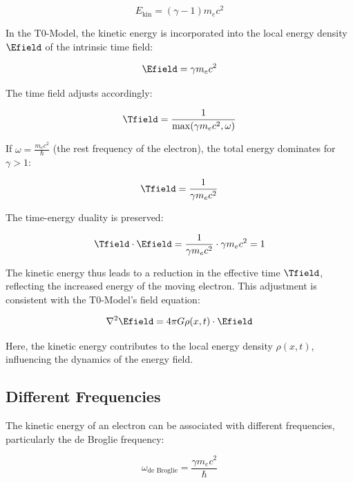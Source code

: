 \begin{equation}
	E_{\text{kin}} = (\gamma - 1) m_e c^2
\end{equation}

In the T0-Model, the kinetic energy is incorporated into the local energy density \( \Efield \) of the intrinsic time field:

\begin{equation}
	\Efield = \gamma m_e c^2
\end{equation}

The time field adjusts accordingly:

\begin{equation}
	\Tfield = \frac{1}{\max(\gamma m_e c^2, \omega)}
\end{equation}

If \(\omega = \frac{m_e c^2}{\hbar}\) (the rest frequency of the electron), the total energy dominates for \(\gamma > 1\):

\begin{equation}
	\Tfield = \frac{1}{\gamma m_e c^2}
\end{equation}

The time-energy duality is preserved:

\begin{equation}
	\Tfield \cdot \Efield = \frac{1}{\gamma m_e c^2} \cdot \gamma m_e c^2 = 1
\end{equation}

The kinetic energy thus leads to a reduction in the effective time \( \Tfield \), reflecting the increased energy of the moving electron. This adjustment is consistent with the T0-Model's field equation:

\begin{equation}
	\nabla^2 \Efield = 4\pi G \rho(x,t) \cdot \Efield
	\label{eq:energy_field_equation}
\end{equation}

Here, the kinetic energy contributes to the local energy density \(\rho(x,t)\), influencing the dynamics of the energy field.

\subsection{Different Frequencies}
\label{subsec:electron_frequencies}

The kinetic energy of an electron can be associated with different frequencies, particularly the de Broglie frequency:

\begin{equation}
	\omega_{\text{de Broglie}} = \frac{\gamma m_e c^2}{\hbar}
\end{equation}

